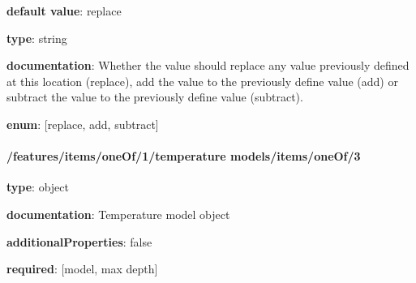 \begin{itemized}
\item {\bf default value}: replace
\item {\bf type}: string
\item {\bf documentation}: Whether the value should replace any value previously defined at this location (replace), add the value to the previously define value (add) or subtract the value to the previously define value (subtract).
\item {\bf enum}: [replace, add, subtract]\end{itemized}\paragraph{/features/items/oneOf/1/temperature models/items/oneOf/3} \begin{itemized}
\item {\bf type}: object
\item {\bf documentation}: Temperature model object
\item {\bf additionalProperties}: false
\item {\bf required}: [model, max depth]\end{itemized}
